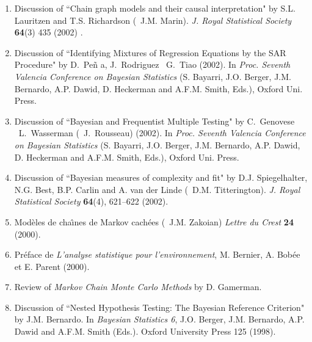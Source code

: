 \begin{enumerate}
\item Discussion of ``Chain graph models and their
causal interpretation" by S.L. Lauritzen and T.S. Richardson
(\avec\ J.M. Marin). {\it J. Royal Statistical Society} {\bf 64}(3) 
435 (2002) .


\item Discussion of ``Identifying Mixtures of Regression Equations by the
SAR Procedure" by D.~Pe\~n a, J.~Rodriguez \et\ G.~Tiao 
(2002). In {\it  Proc. Seventh Valencia Conference on Bayesian Statistics}
(S. Bayarri, J.O. Berger, J.M. Bernardo, A.P. Dawid, D. Heckerman and A.F.M. Smith, Eds.),
Oxford Uni. Press.

\item Discussion of ``Bayesian and Frequentist Multiple Testing" by 
C.~Genovese \et\ L.~Wasserman (\avec\ J.~Rousseau)
(2002). In {\it  Proc. Seventh Valencia Conference on Bayesian Statistics}
(S. Bayarri, J.O. Berger, J.M. Bernardo, A.P. Dawid, D. Heckerman and A.F.M. Smith, Eds.),
Oxford Uni. Press.

\item Discussion of ``Bayesian measures of complexity
and fit" by D.J. Spiegelhalter, N.G. Best, B.P. Carlin
and A. van der Linde (\avec\ D.M. Titterington). 
{\it J. Royal Statistical Society} {\bf 64}(4), 621--622 (2002).

\item Mod\`eles de cha\^\i nes de Markov cach\'ees
(\avec\ J.M. Zakoian) {\it Lettre du Crest} {\bf 24} (2000).

\item Pr\'eface de {\it L'analyse statistique pour
l'environnement}, M. Bernier, A. Bob\'ee et E. Parent (2000).

\item Review of {\it Markov Chain Monte Carlo Methods} by D. Gamerman.

\item Discussion of ``Nested Hypothesis Testing: The Bayesian Reference Criterion"
by J.M. Bernardo. In {\it Bayesian Statistics 6}, J.O. Berger, J.M. Bernardo,
A.P. Dawid and A.F.M. Smith (Eds.). Oxford University Press 125 (1998).


\end{enumerate}
